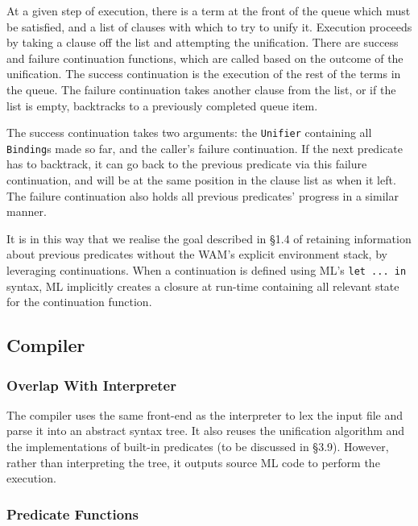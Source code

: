 \documentclass[12pt]{article}
\begin{document}

At a given step of execution, there is a term at the front of the queue which must be satisfied, and a list of clauses with which to try to unify it. 
Execution proceeds by taking a clause off the list and attempting the unification. 
There are success and failure continuation functions, which are called based on the outcome of the unification.
The success continuation is the execution of the rest of the terms in the queue. The failure continuation takes another clause from the list, or if the list is empty, backtracks to a previously completed queue item.


The success continuation takes two arguments: the \verb|Unifier| containing all \verb|Binding|s made so far, and the caller's failure continuation. 
If the next predicate has to backtrack, it can go back to the previous predicate via this failure continuation, and will be at the same position in the clause list as when it left. 
The failure continuation also holds all previous predicates' progress in a similar manner.


It is in this way that we realise the goal described in \S1.4 of retaining information about previous predicates without the WAM's explicit environment stack, by leveraging continuations. 
When a continuation is defined using ML's \verb|let ... in| syntax, ML implicitly creates a closure at run-time containing all relevant state for the continuation function.

\subsection{Compiler}

\subsubsection{Overlap With Interpreter}

The compiler uses the same front-end as the interpreter to lex the input file and parse it into an abstract syntax tree. 
It also reuses the unification algorithm and the implementations of built-in predicates (to be discussed in \S3.9). 
However, rather than interpreting the tree, it outputs source ML code to perform the execution.

\subsubsection{Predicate Functions}
\end{document}
